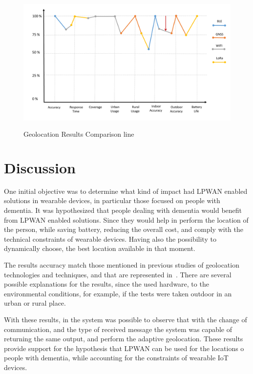 \begin{figure}[htbp]
  \centering
  
    {\includegraphics[width=0.8\linewidth]{Chapters/Figures/radarline.pdf}}%
 
  \caption{Geolocation Results Comparison line}
  \label{fig:radarline}
\end{figure}




\section{Discussion}
\label{sec:Discussion}

One initial objective was to  determine what kind of impact had LPWAN enabled solutions in wearable devices, in particular those focused on people with dementia.\newline 
It was hypothesized that people dealing with dementia would benefit from LPWAN enabled solutions. Since they would help in perform the location of the person, while saving battery, reducing the overall cost, and comply with the technical constraints of wearable devices. Having also the possibility to dynamically choose, the best location available in that moment. 

The results accuracy match those mentioned in previous studies of geolocation technologies and techniques, and that are represented in~.\newline 
There are several possible explanations for the results, since the used hardware, to the environmental conditions, for example, if the tests were taken outdoor in an urban or rural place. 

With these results, in the system  was possible to observe that with the change of communication, and the type of received message the system was capable of returning the same output, and perform the adaptive geolocation.\newline 
These results provide support for the hypothesis that LPWAN can be used for the locations o people with dementia, while accounting for the constraints of wearable IoT devices.



